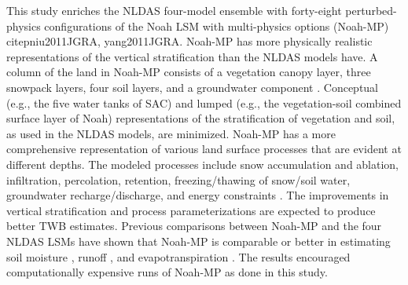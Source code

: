 \documentclass[essd]{copernicus}
\begin{document}
This study enriches the NLDAS four-model ensemble with forty-eight perturbed-physics configurations of the Noah LSM with multi-physics options (Noah-MP) citep{niu2011JGRA, yang2011JGRA}. Noah-MP has more physically realistic representations of the vertical stratification than the NLDAS models have. A column of the land in Noah-MP consists of a vegetation canopy layer, three snowpack layers, four soil layers, and a groundwater component \citep{niu2011JGRA}. Conceptual (e.g., the five water tanks of SAC) and lumped (e.g., the vegetation-soil combined surface layer of Noah) representations of the stratification of vegetation and soil, as used in the NLDAS models, are minimized. Noah-MP has a more comprehensive representation of various land surface processes that are evident at different depths. The modeled processes include snow accumulation and ablation, infiltration, percolation, retention, freezing/thawing of snow/soil water, groundwater recharge/discharge, and energy constraints \citep{niu2011JGRA}. The improvements in vertical stratification and process parameterizations are expected to produce better TWB estimates. Previous comparisons between Noah-MP and the four NLDAS LSMs have shown that Noah-MP is comparable or better in estimating soil moisture \citep{cai2014JGRAa}, runoff \citep{fei2021WRR, cai2014JGRAa}, and evapotranspiration \citep{zhang2020AFM}.  The results encouraged computationally expensive runs of Noah-MP as done in this study.
\end{document}

